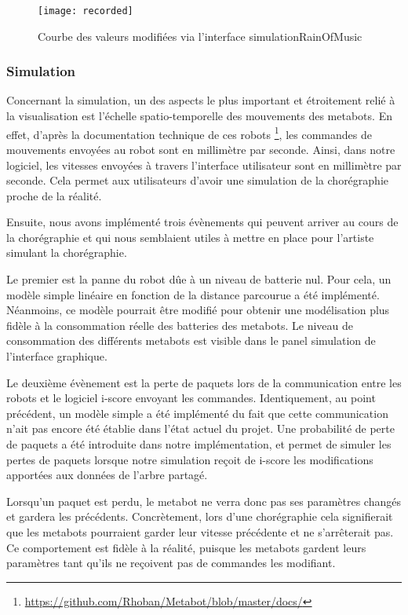 \begin{figure}[H]
\centering
\texttt{[image: recorded]}
\caption{Courbe des valeurs modifiées via l'interface simulationRainOfMusic}
\label{record}
\end{figure} 
\subsubsection{Simulation}

Concernant la simulation, un des aspects le plus important et étroitement relié à la visualisation est l'échelle spatio-temporelle des mouvements des metabots. En effet, d'après la documentation technique de ces robots \footnote{\url{https://github.com/Rhoban/Metabot/blob/master/docs/}}, les commandes de mouvements envoyées au robot sont en millimètre par seconde. Ainsi, dans notre logiciel, les vitesses envoyées à travers l'interface utilisateur sont en millimètre par seconde. Cela permet aux utilisateurs d'avoir une simulation de la chorégraphie proche de la réalité.

Ensuite, nous avons implémenté trois évènements qui peuvent arriver au cours de la chorégraphie et qui nous semblaient utiles à mettre en place pour l'artiste simulant la chorégraphie. 

Le premier est la panne du robot dûe à un niveau de batterie nul. Pour cela, un modèle simple linéaire en fonction de la distance parcourue a été implémenté. Néanmoins, ce modèle pourrait être modifié pour obtenir une modélisation plus fidèle à la consommation réelle des batteries des metabots. Le niveau de consommation des différents metabots est visible dans le panel simulation de l'interface graphique. 

Le deuxième évènement est la perte de paquets lors de la communication entre les robots et le logiciel i-score envoyant les commandes. Identiquement, au point précédent, un modèle simple a été implémenté du fait que cette communication n'ait pas encore été établie dans l'état actuel du projet. Une probabilité de perte de paquets a été introduite dans notre implémentation, et permet de simuler les pertes de paquets lorsque notre simulation reçoit de i-score les modifications apportées aux données de l'arbre partagé. 

Lorsqu'un paquet est perdu, le metabot ne verra donc pas ses paramètres changés et gardera les précédents. Concrètement, lors d'une chorégraphie cela signifierait que les metabots pourraient garder leur vitesse précédente et ne s'arrêterait pas. Ce comportement est fidèle à la réalité, puisque les metabots gardent leurs paramètres tant qu'ils ne reçoivent pas de commandes les modifiant. 

